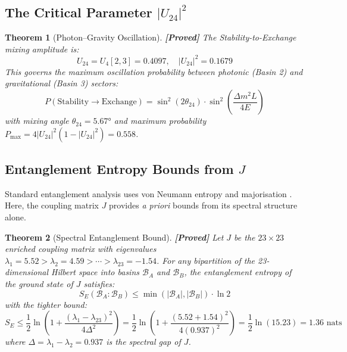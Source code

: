 \documentclass[12pt,a4paper]{article}
\newcommand{\proved}[1]{\textcolor{proved}{\textbf{[Proved]}} #1}
\newtheorem{theorem}{Theorem}[section]
\theoremstyle{definition}
\theoremstyle{remark}
\newcommand{\Basin}{\mathcal{B}}
\newcommand{\Umix}{U_4}
\newcommand{\Jcoup}{J}
\begin{document}
\subsection{The Critical Parameter $|U_{24}|^2$}

\begin{theorem}[Photon--Gravity Oscillation]
\label{thm:u24}
\proved{The Stability-to-Exchange mixing amplitude is:}
\begin{equation}
  U_{24} = \Umix[2,3] = 0.4097, \quad
  |U_{24}|^2 = 0.1679
\end{equation}
This governs the maximum oscillation probability between photonic (Basin 2)
and gravitational (Basin 3) sectors:
\begin{equation}
  P(\text{Stability} \to \text{Exchange}) = \sin^2(2\theta_{24}) \cdot \sin^2\!\left(\frac{\Delta m^2 L}{4E}\right)
\end{equation}
with mixing angle $\theta_{24} = 5.67°$ and maximum probability
$P_{\max} = 4|U_{24}|^2(1-|U_{24}|^2) = 0.558$.
\end{theorem}

\subsection{Entanglement Entropy Bounds from $\Jcoup$}

Standard entanglement analysis uses von Neumann entropy and majorisation
\cite{nielsen_chuang}. Here, the coupling matrix $\Jcoup$ provides
\emph{a priori} bounds from its spectral structure alone.

\begin{theorem}[Spectral Entanglement Bound]
\label{thm:entropy_bound}
\proved{Let $\Jcoup$ be the $23 \times 23$ enriched coupling matrix with
eigenvalues $\lambda_1 = 5.52 > \lambda_2 = 4.59 > \cdots > \lambda_{23} = -1.54$. For any bipartition of the 23-dimensional Hilbert space into basins $\Basin_A$ and $\Basin_B$, the entanglement entropy of the ground state of $\Jcoup$ satisfies:}
\begin{equation}
  S_E(\Basin_A : \Basin_B) \leq \min(|\Basin_A|, |\Basin_B|) \cdot \ln 2
\end{equation}
with the tighter bound:
\begin{equation}
  S_E \leq \frac{1}{2} \ln\!\left(1 + \frac{(\lambda_1 - \lambda_{23})^2}{4\Delta^2}\right)
  = \frac{1}{2} \ln\!\left(1 + \frac{(5.52 + 1.54)^2}{4(0.937)^2}\right)
  = \frac{1}{2}\ln(15.23)
  = 1.36 \text{ nats}
\end{equation}
where $\Delta = \lambda_1 - \lambda_2 = 0.937$ is the spectral gap of $\Jcoup$.
\end{theorem}
\end{document}
